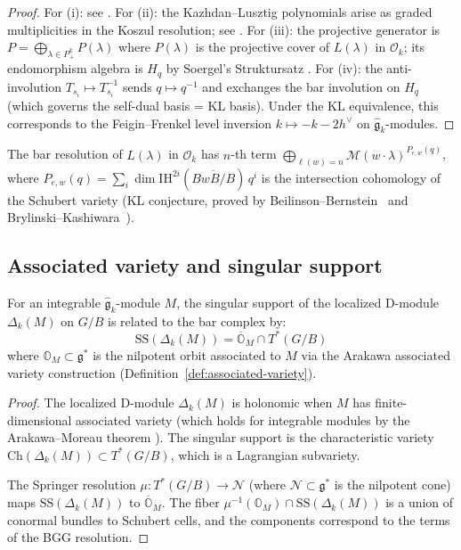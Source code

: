\begin{proof}
For (i): see \cite[Theorem~3.11.1]{BGS96}.
For (ii): the Kazhdan--Lusztig polynomials arise as graded
multiplicities in the Koszul resolution; see
\cite[Theorem~1.1]{Soergel97}.
For (iii): the projective generator is
$P = \bigoplus_{\lambda \in P_+^k} P(\lambda)$ where $P(\lambda)$
is the projective cover of $L(\lambda)$ in $\mathcal{O}_k$; its
endomorphism algebra is $H_q$ by Soergel's Struktursatz
\cite{Soergel97}.
For (iv): the anti-involution $T_{s_i} \mapsto T_{s_i}^{-1}$
sends $q \mapsto q^{-1}$ and exchanges the bar involution on $H_q$
(which governs the self-dual basis = KL basis). Under the
KL equivalence, this corresponds to the Feigin--Frenkel level
inversion $k \mapsto -k - 2h^\vee$ on
$\widehat{\mathfrak{g}}_k$-modules.
\end{proof}

\begin{remark}
\label{rem:bar-complex-kl-polynomials}
The bar resolution of $L(\lambda)$ in $\mathcal{O}_k$ has $n$-th term $\bigoplus_{\ell(w) = n} \mathcal{M}(w \cdot \lambda)^{P_{e,w}(q)}$, where $P_{e,w}(q) = \sum_i \dim \mathrm{IH}^{2i}(\overline{BwB/B})\, q^i$ is the intersection cohomology of the Schubert variety (KL conjecture, proved by Beilinson--Bernstein~\cite{BB81} and Brylinski--Kashiwara~\cite{BK81}).
\end{remark}

\subsection{Associated variety and singular support}

\begin{proposition}
\label{prop:bar-singular-support}
For an integrable $\widehat{\mathfrak{g}}_k$-module $M$, the
singular support of the localized D-module $\Delta_k(M)$ on $G/B$
is related to the bar complex by:
\[
\mathrm{SS}(\Delta_k(M))
= \overline{\mathbb{O}}_M \cap T^*(G/B)
\]
where $\mathbb{O}_M \subset \mathfrak{g}^*$ is the nilpotent orbit
associated to $M$ via the Arakawa associated variety construction
\textup{(}Definition~\textup{\ref{def:associated-variety})}.
\end{proposition}

\begin{proof}
The localized D-module $\Delta_k(M)$ is holonomic when $M$ has
finite-dimensional associated variety (which holds for integrable
modules by the Arakawa--Moreau theorem \cite{Ara12}).
The singular support is the characteristic variety
$\mathrm{Ch}(\Delta_k(M)) \subset T^*(G/B)$, which is a
Lagrangian subvariety.

The Springer resolution $\mu: T^*(G/B) \to \mathcal{N}$
(where $\mathcal{N} \subset \mathfrak{g}^*$ is the nilpotent cone)
maps $\mathrm{SS}(\Delta_k(M))$ to $\overline{\mathbb{O}}_M$.
The fiber $\mu^{-1}(\mathbb{O}_M) \cap \mathrm{SS}(\Delta_k(M))$
is a union of conormal bundles to Schubert cells, and the
components correspond to the terms of the BGG resolution.
\end{proof}

